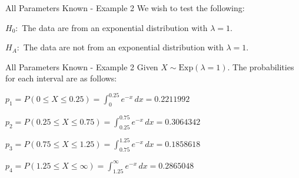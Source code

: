 \documentclass[
  ignorenonframetext,
]{beamer}
\begin{document}
\begin{frame}{All Parameters Known - Example 2}
\label{all-parameters-known---example-2-1}
We wish to test the following:

\begin{tcolorbox}
$H_0:$ The data are from an exponential distribution with $\lambda = 1$.

$H_A:$ The data are not from an exponential distribution with $\lambda = 1$.
\end{tcolorbox}
\end{frame}

\begin{frame}{All Parameters Known - Example 2}
\label{all-parameters-known---example-2-2}
Given \(X \sim \text{Exp}(\lambda = 1)\). The probabilities for each
interval are as follows:

\(p_1 = P(0 \leq X \leq 0.25)=\int_0^{0.25}e^{-x}\,dx =0.2211992\)

\(p_2 = P(0.25 \leq X \leq 0.75)=\int_{0.25}^{0.75}e^{-x}\,dx =0.3064342\)

\(p_3 = P(0.75 \leq X \leq 1.25)=\int_{0.75}^{1.25}e^{-x}\,dx =0.1858618\)

\(p_4 = P(1.25 \leq X \leq \infty)=\int_{1.25}^{\infty}e^{-x}\,dx =0.2865048\)
\end{frame}
\end{document}
